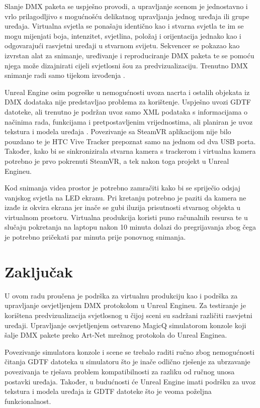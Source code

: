 \documentclass[times, utf8, zavrsni, numeric]{fer}
\begin{document}
Slanje DMX paketa se uspješno provodi, a upravljanje scenom je jednostavno i vrlo prilagodljivo s mogućnošću delikatnog upravljanja jednog uređaja ili grupe uređaja. Virtualna svjetla se ponašaju identično kao i stvarna svjetla te im se mogu mijenjati boja, intenzitet, svjetlina, položaj i orijentacija jednako kao i odgovarajući rasvjetni uređaji u stvarnom svijetu. Sekvencer se pokazao kao izvrstan alat za snimanje, uređivanje i reproduciranje DMX paketa te se pomoću njega može dizajnirati cijeli svjetlosni šou za predvizualizaciju. Trenutno DMX snimanje radi samo tijekom izvođenja \cite{dmx_tracks}. \newline

Unreal Engine osim pogreške u nemogućnosti uvoza nacrta i ostalih objekata iz DMX dodataka nije predstavljao problema za korištenje. Uspješno uvozi GDTF datoteke, ali trenutno je podržan uvoz samo XML podataka s informacijama o načinima rada, funkcijama i pretpostavljenim vrijednostima, ali planiran je uvoz tekstura i modela uređaja \cite{dmx_gdtf}. Povezivanje sa SteamVR aplikacijom nije bilo pouzdano te je HTC Vive Tracker prepoznat samo na jednom od dva USB porta. Također, kako bi se sinkronizirala stvarna kamera s trackerom i virtualna kamera potrebno je prvo pokrenuti SteamVR, a tek nakon toga projekt u Unreal Engineu. \newline

Kod snimanja videa prostor je potrebno zamračiti kako bi se spriječio odsjaj vanjskog svjetla na LED ekranu. Pri kretanju potrebno je paziti da kamera ne izađe iz okvira ekrana jer inače se gubi iluzija prisutnosti stvarnog objekta u virtualnom prostoru. Virtualna produkcija koristi puno računalnih resursa te u slučaju pokretanja na laptopu nakon 10 minuta dolazi do pregrijavanja zbog čega je potrebno pričekati par minuta prije ponovnog snimanja.

\chapter{Zaključak}
U ovom radu proučena je podrška za virtualnu produkciju kao i podrška za upravljanje osvjetljenjem DMX protokolom u Unreal Engineu. Za testiranje je korištena predvizualizacija svjetlosnog u čijoj sceni su sadržani različiti rasvjetni uređaji. Upravljanje osvjetljenjem ostvareno MagicQ simulatorom konzole koji šalje DMX pakete preko Art-Net mrežnog protokola do Unreal Enginea. \newline

Povezivanje simulatora konzole i scene se trebalo raditi ručno zbog nemogućnosti čitanja GDTF datoteka u simulatoru što je inače odlično rješenje za ubrzavanje povezivanja te rješava problem kompatibilnosti za razliku od ručnog unosa postavki uređaja. Također, u budućnosti će Unreal Engine imati podršku za uvoz tekstura i modela uređaja iz GDTF datoteke što je veoma poželjna funkcionalnost. \newline
\end{document}
